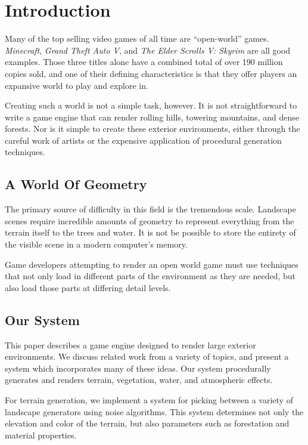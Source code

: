 
\chapter{Introduction}


Many of the top selling video games of all time are ``open-world'' games.
{\em Minecraft}, {\em Grand Theft Auto V}, and {\em The Elder Scrolls V: Skyrim} are all good examples.
Those three titles alone have a combined total of over 190 million copies sold, and one of their defining characteristics is that they offer players an expansive world to play and explore in.

Creating such a world is not a simple task, however.
It is not straightforward to write a game engine that can render rolling hills, towering mountains, and dense forests.
Nor is it simple to create these exterior environments, either through the careful work of artists or the expensive application of procedural generation techniques.


\section{A World Of Geometry}

The primary source of difficulty in this field is the tremendous scale.
Landscape scenes require incredible amounts of geometry to represent everything from the terrain itself to the trees and water.
It is not be possible to store the entirety of the visible scene in a modern computer's memory.

Game developers attempting to render an open world game must use techniques that not only load in different parts of the environment as they are needed, but also load those parts at differing detail levels.


\section{Our System}


This paper describes a game engine designed to render large exterior environments.
We discuss related work from a variety of topics, and present a system which incorporates many of these ideas.
Our system procedurally generates and renders terrain, vegetation, water, and atmospheric effects.

For terrain generation, we implement a system for picking between a variety of landscape generators using noise algorithms.
This system determines not only the elevation and color of the terrain, but also parameters such as forestation and material properties.

